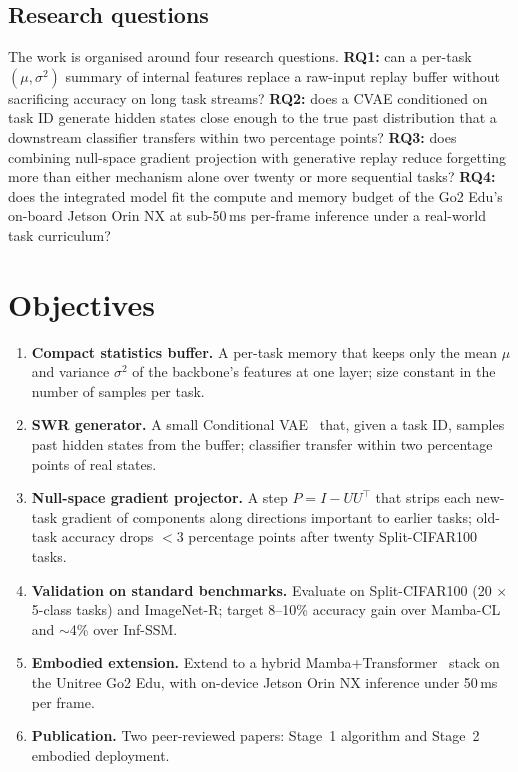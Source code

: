 \documentclass[11pt,a4paper]{article}
\newcommand{\objbold}[1]{\textbf{\color{neuroblue}#1}}
\begin{document}
\subsection{Research questions}
The work is organised around four research questions.
\textbf{RQ1:} can a per-task $(\mu,\sigma^{2})$ summary of internal features replace a raw-input replay buffer without sacrificing accuracy on long task streams?
\textbf{RQ2:} does a CVAE conditioned on task ID generate hidden states close enough to the true past distribution that a downstream classifier transfers within two percentage points?
\textbf{RQ3:} does combining null-space gradient projection with generative replay reduce forgetting more than either mechanism alone over twenty or more sequential tasks?
\textbf{RQ4:} does the integrated model fit the compute and memory budget of the Go2 Edu's on-board Jetson Orin NX at sub-50\,ms per-frame inference under a real-world task curriculum?

\section{Objectives}

\begin{enumerate}[label=\textbf{O\arabic*.},leftmargin=2.2em,itemsep=0.05em,topsep=0.1em]
  \item \objbold{Compact statistics buffer.} A per-task memory that keeps only the mean $\mu$ and variance $\sigma^{2}$ of the backbone's features at one layer; size constant in the number of samples per task.
  \item \objbold{SWR generator.} A small Conditional VAE~\citep{sohn2015learning} that, given a task ID, samples past hidden states from the buffer; classifier transfer within two percentage points of real states.
  \item \objbold{Null-space gradient projector.} A step $P=I-UU^{\top}$ that strips each new-task gradient of components along directions important to earlier tasks; old-task accuracy drops $<\!3$ percentage points after twenty Split-CIFAR100 tasks.
  \item \objbold{Validation on standard benchmarks.} Evaluate on Split-CIFAR100 (20 $\times$ 5-class tasks) and ImageNet-R; target 8--10\% accuracy gain over Mamba-CL and $\sim$4\% over Inf-SSM.
  \item \objbold{Embodied extension.} Extend to a hybrid Mamba+Transformer~\citep{vaswani2017attention} stack on the Unitree Go2 Edu, with on-device Jetson Orin NX inference under 50\,ms per frame.
  \item \objbold{Publication.} Two peer-reviewed papers: Stage~1 algorithm and Stage~2 embodied deployment.
\end{enumerate}
\end{document}

